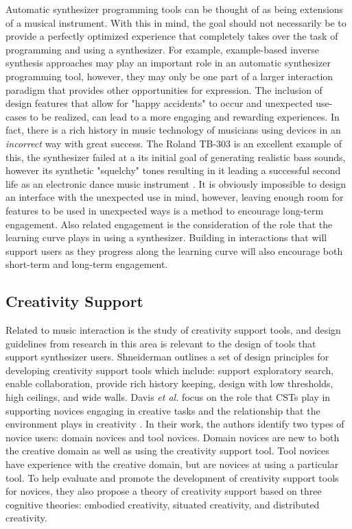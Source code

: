 Automatic synthesizer programming tools can be thought of as being extensions of a musical instrument. With this in mind, the goal should not necessarily be to provide a perfectly optimized experience that completely takes over the task of programming and using a synthesizer. For example, example-based inverse synthesis approaches may play an important role in an automatic synthesizer programming tool, however, they may only be one part of a larger interaction paradigm that provides other opportunities for expression. The inclusion of design features that allow for "happy accidents" to occur and unexpected use-cases to be realized, can lead to a more engaging and rewarding experiences. In fact, there is a rich history in music technology of musicians using devices in an \textit{incorrect} way with great success. The Roland TB-303 is an excellent example of this, the synthesizer failed at a its initial goal of generating realistic bass sounds, however its synthetic "squelchy" tones resulting in it leading a successful second life as an electronic dance music instrument \cite{vine2011tb303}. It is obviously impossible to design an interface with the unexpected use in mind, however, leaving enough room for features to be used in unexpected ways is a method to encourage long-term engagement. Also related engagement is the consideration of the role that the learning curve plays in using a synthesizer. Building in interactions that will support users as they progress along the learning curve will also encourage both short-term and long-term engagement.

\subsection{Creativity Support}
Related to music interaction is the study of creativity support tools, and design guidelines from research in this area is relevant to the design of tools that support synthesizer users. Shneiderman \cite{shneiderman2007creativity} outlines a set of design principles for developing creativity support tools which include: support exploratory search, enable collaboration, provide rich history keeping, design with low thresholds, high ceilings, and wide walls. Davis \textit{et al.} focus on the role that CSTs play in supporting novices engaging in creative tasks and the relationship that the environment plays in creativity \cite{davis2013toward}. In their work, the authors identify two types of novice users: domain novices and tool novices. Domain novices are new to both the creative domain as well as using the creativity support tool. Tool novices have experience with the creative domain, but are novices at using a particular tool. To help evaluate and promote the development of creativity support tools for novices, they also propose a theory of creativity support based on three cognitive theories: embodied creativity, situated creativity, and distributed creativity.


